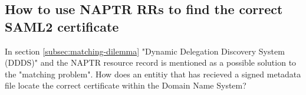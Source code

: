 \subsection{How to use NAPTR RRs to find the correct SAML2 certificate}
In section \ref{subsec:matching-dilemma} "Dynamic Delegation Discovery System (DDDS)"\cite{rfc:3401,rfc:3402,rfc:3403,rfc:3404} and the NAPTR resource record\cite{rfc:3403} is mentioned as a possible solution to the "matching problem".
How does an entitiy that has recieved a signed metadata file locate the correct certificate within the Domain Name System?


